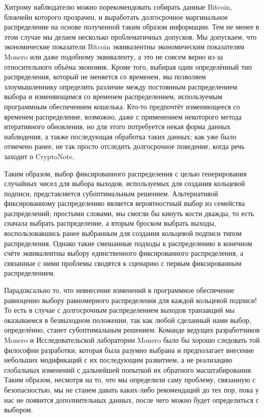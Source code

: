 \documentclass{mrl}
\begin{document}
Хитрому наблюдателю можно порекомендовать собирать данные Bitcoin, блокчейн которого прозрачен, и выработать долгосрочное маргинальное распределение на основе полученной таким образом информации. Тем не менее в этом случае мы делаем несколько проблематичных допусков. Мы допускаем, что экономические показатели Bitcoin эквивалентны экономическим показателям Monero или даже подобному эквиваленту, а это не совсем верно из-за относительного объёма экономик. Кроме того, выбирая один определённый тип распределения, который не меняется со временем, мы позволяем злоумышленнику определить различие между постоянным распределением выбора и изменяющимся со временем распределением, используемым программным обеспечением кошелька. Кто-то предпочтёт изменяющееся со временем распределение, возможно, даже с применением некоторого метода итеративного обновления, но для этого потребуется некая форма данных наблюдения, а также последующая обработка таких данных; как уже было отмечено ранее, не так просто отследить долгосрочное поведение, когда речь заходит о CryptoNote.

Таким образом, выбор фиксированного распределения с целью генерирования случайных чисел для выбора выходов, используемых для создания кольцевой подписи, представляется субоптимальным решением. Альтернативой фиксированному распределению является вероятностный выбор из семейства распределений; простыми словами, мы смогли бы кинуть кости дважды, то есть сначала выбрать распределение, а вторым броском выбрать выходы, воспользовавшись ранее выбранным для создания кольцевой подписи типом распределения. Однако такие смешанные подходы к распределению в конечном счёте эквивалентны выбору единственного фиксированного распределения, а связанные с ними проблемы сводятся к сценарию с первым фиксированным распределением.

Парадоксально то, что невнесение изменений в программное обеспечение равноценно выбору равномерного распределения для каждой кольцевой подписи! То есть в случае с долгосрочным распределением выходов транзакций мы оказываемся в безвыходном положении, так как любой сделанный нами выбор, определённо, станет субоптимальным решением. Команде ведущих разработчиков Monero и Исследовательской лаборатории Monero было бы хорошо следовать той философии разработки, которая была разумно выбрана и предполагает внесение небольших модификаций с их последующим развитием, а не реализацию глобальных изменений с дальнейшей попыткой их обратного масштабирования. Таким образом, несмотря на то, что мы определили саму проблему, связанную с безопасностью, мы не станем давать каких-либо рекомендаций до тех пор, пока у нас не появится дополнительных данных, после чего можно будет определиться с выбором.
\end{document}

